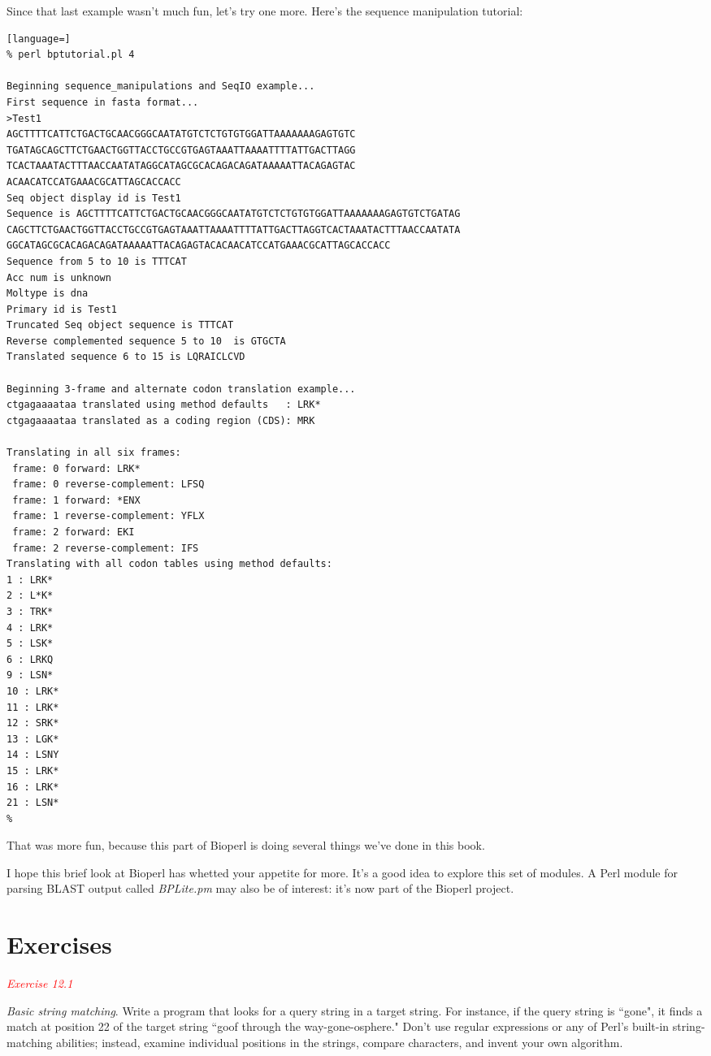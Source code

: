 Since that last example wasn't much fun, let's try one more. Here's the sequence manipulation tutorial: 

\begin{lstlisting}[language=]
% perl bptutorial.pl 4

Beginning sequence_manipulations and SeqIO example... 
First sequence in fasta format... 
>Test1
AGCTTTTCATTCTGACTGCAACGGGCAATATGTCTCTGTGTGGATTAAAAAAAGAGTGTC
TGATAGCAGCTTCTGAACTGGTTACCTGCCGTGAGTAAATTAAAATTTTATTGACTTAGG
TCACTAAATACTTTAACCAATATAGGCATAGCGCACAGACAGATAAAAATTACAGAGTAC
ACAACATCCATGAAACGCATTAGCACCACC
Seq object display id is Test1
Sequence is AGCTTTTCATTCTGACTGCAACGGGCAATATGTCTCTGTGTGGATTAAAAAAAGAGTGTCTGATAG
CAGCTTCTGAACTGGTTACCTGCCGTGAGTAAATTAAAATTTTATTGACTTAGGTCACTAAATACTTTAACCAATATA
GGCATAGCGCACAGACAGATAAAAATTACAGAGTACACAACATCCATGAAACGCATTAGCACCACC 
Sequence from 5 to 10 is TTTCAT 
Acc num is unknown 
Moltype is dna 
Primary id is Test1 
Truncated Seq object sequence is TTTCAT 
Reverse complemented sequence 5 to 10  is GTGCTA  
Translated sequence 6 to 15 is LQRAICLCVD 

Beginning 3-frame and alternate codon translation example... 
ctgagaaaataa translated using method defaults   : LRK*
ctgagaaaataa translated as a coding region (CDS): MRK

Translating in all six frames:
 frame: 0 forward: LRK*
 frame: 0 reverse-complement: LFSQ
 frame: 1 forward: *ENX
 frame: 1 reverse-complement: YFLX
 frame: 2 forward: EKI
 frame: 2 reverse-complement: IFS
Translating with all codon tables using method defaults:
1 : LRK*
2 : L*K*
3 : TRK*
4 : LRK*
5 : LSK*
6 : LRKQ
9 : LSN*
10 : LRK*
11 : LRK*
12 : SRK*
13 : LGK*
14 : LSNY
15 : LRK*
16 : LRK*
21 : LSN*
% 
\end{lstlisting}

That was more fun, because this part of Bioperl is doing several things we've done in this book.

I hope this brief look at Bioperl has whetted your appetite for more. It's a good idea to explore this set of modules. A Perl module for parsing BLAST output called \textit{BPLite.pm} may also be of interest: it's now part of the Bioperl project. 

\section{Exercises}
\textcolor{red}{\textit{Exercise 12.1}}
\begin{adjustwidth}{1cm}{}
\textit{Basic string matching}. Write a program that looks for a query string in a target string. For instance, if the query string is ``gone", it finds a match at position 22 of the target string ``goof through the way-gone-osphere." Don't use regular expressions or any of Perl's built-in string-matching abilities; instead, examine individual positions in the strings, compare characters, and invent your own algorithm. 
\end{adjustwidth}

